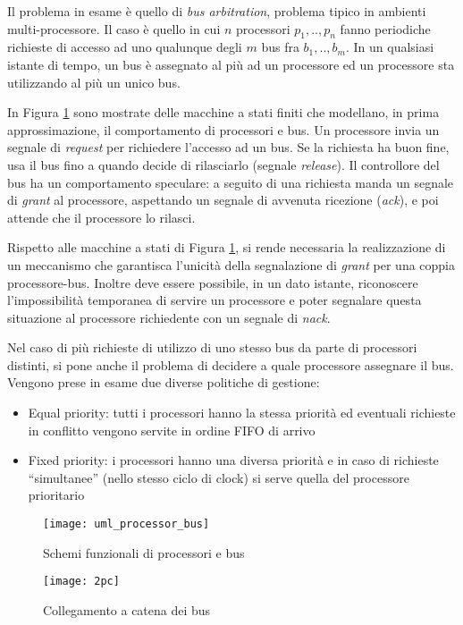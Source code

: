 Il problema in esame è quello di \textit{bus arbitration}, problema tipico in ambienti multi-processore. Il caso è quello in cui $n$ processori ${p_1,..,p_n}$  fanno periodiche richieste di accesso ad uno qualunque degli $m$ bus fra ${b_1,..,b_m}$. In un qualsiasi istante di tempo, un bus è assegnato al più ad un processore ed un processore sta utilizzando al più un unico bus.

In Figura \ref{Fig:uml} sono mostrate delle macchine a stati finiti che modellano, in prima approssimazione, il comportamento di processori e bus. Un processore invia un segnale di \textit{request} per richiedere l'accesso ad un bus. Se la richiesta ha buon fine, usa il bus fino a quando decide di rilasciarlo (segnale \textit{release}). Il controllore del bus ha un comportamento speculare: a seguito di una richiesta manda un segnale di \textit{grant} al processore, aspettando un segnale di avvenuta ricezione (\textit{ack}), e poi attende che il processore lo rilasci.

Rispetto alle macchine a stati di Figura \ref{Fig:uml}, si rende necessaria la realizzazione di un meccanismo che garantisca l'unicità della segnalazione di \textit{grant} per una coppia processore-bus. Inoltre deve essere possibile, in un dato istante, riconoscere l'impossibilità temporanea di servire un processore e poter segnalare questa situazione al processore richiedente con un segnale di \textit{nack}.

Nel caso di più richieste di utilizzo di uno stesso bus da parte di processori distinti, si pone anche il problema di decidere a quale processore assegnare il bus. Vengono prese in esame due diverse politiche di gestione:
\begin{itemize}
\item Equal priority:  tutti i processori hanno la stessa priorità ed eventuali richieste in conflitto vengono servite in ordine FIFO di arrivo
\item Fixed priority:  i processori hanno una diversa priorità e in caso di richieste \textquotedblleft simultanee\textquotedblright{} (nello stesso ciclo di clock) si serve quella del processore prioritario
\end{itemize}

\begin{figure}
\texttt{[image: uml\_processor\_bus]}
\caption{Schemi funzionali di processori e bus}
\label{Fig:uml}
\end{figure}
\begin{figure}
\texttt{[image: 2pc]}
\caption{Collegamento a catena dei bus}
\label{Fig:2pc}
\end{figure}

